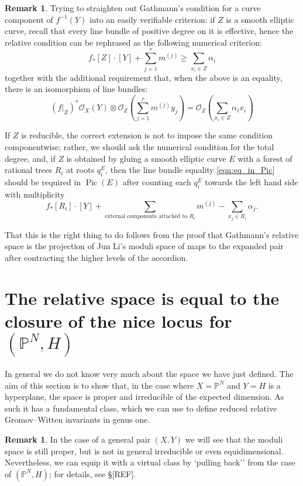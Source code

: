 \documentclass[11pt]{amsart}
\newcommand{\PP}{\mathbb P}
\newcommand{\OO}{\mathcal{O}}
\newcommand{\Pic}{\operatorname{Pic}}
\theoremstyle{definition}
\theoremstyle{definition}
\newtheorem{remark}[thm]{Remark}
\begin{document}
\begin{remark}
Trying to straighten out Gathmann's condition for a curve component of $f^{-1}(Y)$ into an easily verifiable criterion: if $Z$ is a smooth elliptic curve, recall that every line bundle of positive degree on it is effective, hence the relative condition can be rephrased as the following numerical criterion:
\begin{equation*} f_*[Z]\cdot [Y]+\sum_{j=1}^r m^{(j)}\geq \sum_{x_i\in Z}\alpha_i \end{equation*}
together with the additional requirement that, when the above is an equality, there is an isomorphism of line bundles:
\begin{equation} \label{eqn:eq_in_Pic}
(f|_{Z})^*\OO_X(Y) \otimes \OO_Z\left(\sum_{j=1}^r m^{(j)}y_j\right)=\OO_Z\left(\sum_{x_i\in Z}\alpha_ix_i\right) 
\end{equation}
 
 If $Z$ is reducible, the correct extension is not to impose the same condition componentwise; rather, we should ask the numerical condition for the total degree, and, if $Z$ is obtained by gluing a smooth elliptic curve $E$ with a forest of rational trees $R_i$ at roots $q^E_i$, then the line bundle equality \eqref{eqn:eq_in_Pic} should be required in $\Pic(E)$ after counting each $q^E_i$ towards the left hand side with multiplicity
 \[f_*[R_i]\cdot [Y]+\sum_{\text{external components attached to $R_i$}} m^{(j)}- \sum_{x_j\in R_i}\alpha_j.\]
 
 That this is the right thing to do follows from the proof that Gathmann's relative space is the projection of Jun Li's moduli space of maps to the expanded pair after contracting the higher levels of the accordion.
\end{remark}

\section{The relative space is equal to the closure of the nice locus for $(\PP^N,H)$}
\noindent In general we do not know very much about the space we have just defined. The aim of this section is to show that, in the case where $X=\PP^N$ and $Y=H$ is a hyperplane, the space is proper and irreducible of the expected dimension. As such it has a fundamental class, which we can use to define reduced relative Gromov--Witten invariants in genus one.

\begin{remark} In the case of a general pair $(X,Y)$ we will see that the moduli space is still proper, but is not in general irreducible or even equidimensional. Nevertheless, we can equip it with a virtual class by `pulling back'' from the case of $(\PP^N,H)$; for details, see \S [REF]. \end{remark}
\end{document}
